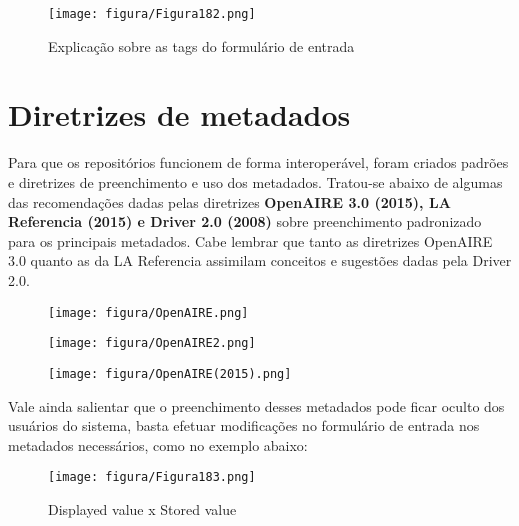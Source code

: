 \documentclass[12pt,hidelinks]{article}
\begin{document}
    \begin{figure}[!htp]
                \centering
                \texttt{[image: figura/Figura182.png]}
                \caption{Explicação sobre as tags do formulário de entrada}
            \label{Rotulo}
        \end{figure}

\newpage

\section{Diretrizes de metadados}

\newpage
    
    Para que os repositórios funcionem de forma interoperável, foram criados padrões e diretrizes de preenchimento e uso dos metadados. Tratou-se abaixo de algumas das recomendações dadas pelas diretrizes \textbf{OpenAIRE 3.0 (2015), LA Referencia (2015) e Driver 2.0 (2008)} sobre preenchimento padronizado para os principais metadados. Cabe lembrar que tanto as diretrizes OpenAIRE 3.0 quanto as da LA Referencia assimilam conceitos e sugestões dadas pela Driver 2.0.
    
    \begin{figure}[!htp]
                \centering
                \texttt{[image: figura/OpenAIRE.png]}
            \label{Rotulo}
        \end{figure}
    
    \begin{figure}[!htp]
                \centering
                \texttt{[image: figura/OpenAIRE2.png]}
            \label{Rotulo}
        \end{figure}
        
    \begin{figure}[!htp]
                \centering
                \texttt{[image: figura/OpenAIRE(2015).png]}
            \label{Rotulo}
        \end{figure}
        
\newpage
   
    Vale ainda salientar que o preenchimento desses metadados pode ficar oculto dos usuários do sistema, basta efetuar modificações no formulário de entrada nos metadados necessários, como no exemplo abaixo:
    
    \begin{figure}[!htp]
                \centering
                \texttt{[image: figura/Figura183.png]}
                \caption{Displayed value x Stored value}
            \label{Rotulo}
        \end{figure}
\end{document}

